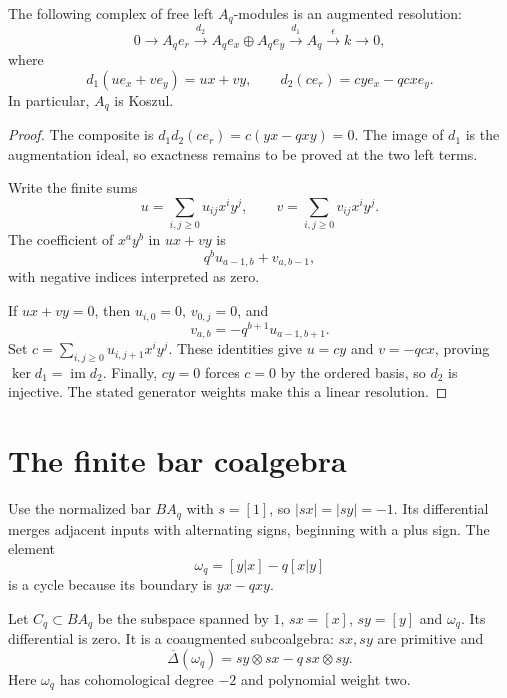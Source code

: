 \begin{theorem}[Koszulness]\label{cbc:qplane:resolution}
The following complex of free left $A_q$-modules is an augmented resolution:
\[
 0\longrightarrow A_qe_r
 \xrightarrow{d_2}A_qe_x\oplus A_qe_y
 \xrightarrow{d_1}A_q\xrightarrow{\epsilon}k\longrightarrow0,
\]
where
\[
 d_1(ue_x+ve_y)=ux+vy,\qquad
 d_2(ce_r)=cy e_x-qcx e_y.
\]
In particular, $A_q$ is Koszul.
\end{theorem}
\begin{proof}
The composite is $d_1d_2(ce_r)=c(yx-qxy)=0$.
The image of $d_1$ is the augmentation ideal, so exactness remains to be proved at the two left terms.

Write the finite sums
\[
 u=\sum_{i,j\ge0}u_{ij}x^iy^j,\qquad
 v=\sum_{i,j\ge0}v_{ij}x^iy^j.
\]
The coefficient of $x^ay^b$ in $ux+vy$ is
\[
 q^b u_{a-1,b}+v_{a,b-1},
\]
with negative indices interpreted as zero.

If $ux+vy=0$, then $u_{i,0}=0$, $v_{0,j}=0$, and
\[
 v_{a,b}=-q^{b+1}u_{a-1,b+1}.
\]
Set $c=\sum_{i,j\ge0}u_{i,j+1}x^iy^j$.
These identities give $u=cy$ and $v=-qcx$, proving $\ker d_1=\operatorname{im}d_2$.
Finally, $cy=0$ forces $c=0$ by the ordered basis, so $d_2$ is injective.
The stated generator weights make this a linear resolution.
\end{proof}

\section{The finite bar coalgebra}

Use the normalized bar $BA_q$ with $s=[1]$, so $|sx|=|sy|=-1$.
Its differential merges adjacent inputs with alternating signs, beginning with a plus sign.
The element
\[
 \omega_q=[y|x]-q[x|y]
\]
is a cycle because its boundary is $yx-qxy$.

Let $C_q\subset BA_q$ be the subspace spanned by $1$, $sx=[x]$, $sy=[y]$ and $\omega_q$.
Its differential is zero.
It is a coaugmented subcoalgebra: $sx,sy$ are primitive and
\begin{equation}\label{eq:cbc:qplane:coproduct}
 \overline\Delta(\omega_q)=sy\otimes sx-q\,sx\otimes sy.
\end{equation}
Here $\omega_q$ has cohomological degree $-2$ and polynomial weight two.

